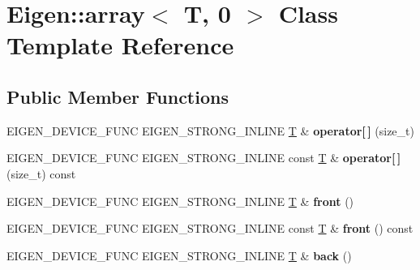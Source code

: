 \hypertarget{class_eigen_1_1array_3_01_t_00_010_01_4}{}\section{Eigen\+:\+:array$<$ T, 0 $>$ Class Template Reference}
\label{class_eigen_1_1array_3_01_t_00_010_01_4}
\subsection*{Public Member Functions}
\begin{DoxyCompactItemize}
\item 
\mbox{\label{class_eigen_1_1array_3_01_t_00_010_01_4_a37c62e5ec4b7ea518711ef63c3381d47}} 
E\+I\+G\+E\+N\+\_\+\+D\+E\+V\+I\+C\+E\+\_\+\+F\+U\+NC E\+I\+G\+E\+N\+\_\+\+S\+T\+R\+O\+N\+G\+\_\+\+I\+N\+L\+I\+NE \hyperlink{group___sparse_core___module}{T} \& {\bfseries operator\mbox{[}$\,$\mbox{]}} (size\+\_\+t)
\item 
\mbox{\label{class_eigen_1_1array_3_01_t_00_010_01_4_a276c1f31385f03d9c03df6a859bcb6c2}} 
E\+I\+G\+E\+N\+\_\+\+D\+E\+V\+I\+C\+E\+\_\+\+F\+U\+NC E\+I\+G\+E\+N\+\_\+\+S\+T\+R\+O\+N\+G\+\_\+\+I\+N\+L\+I\+NE const \hyperlink{group___sparse_core___module}{T} \& {\bfseries operator\mbox{[}$\,$\mbox{]}} (size\+\_\+t) const
\item 
\mbox{\label{class_eigen_1_1array_3_01_t_00_010_01_4_a665ea311f514508fcba9084b39d38f21}} 
E\+I\+G\+E\+N\+\_\+\+D\+E\+V\+I\+C\+E\+\_\+\+F\+U\+NC E\+I\+G\+E\+N\+\_\+\+S\+T\+R\+O\+N\+G\+\_\+\+I\+N\+L\+I\+NE \hyperlink{group___sparse_core___module}{T} \& {\bfseries front} ()
\item 
\mbox{\label{class_eigen_1_1array_3_01_t_00_010_01_4_a75685c5ac8ff4d88eb037da85b27531a}} 
E\+I\+G\+E\+N\+\_\+\+D\+E\+V\+I\+C\+E\+\_\+\+F\+U\+NC E\+I\+G\+E\+N\+\_\+\+S\+T\+R\+O\+N\+G\+\_\+\+I\+N\+L\+I\+NE const \hyperlink{group___sparse_core___module}{T} \& {\bfseries front} () const
\item 
\mbox{\label{class_eigen_1_1array_3_01_t_00_010_01_4_ae60d3aaa550a38bc33216b68d9e20f78}} 
E\+I\+G\+E\+N\+\_\+\+D\+E\+V\+I\+C\+E\+\_\+\+F\+U\+NC E\+I\+G\+E\+N\+\_\+\+S\+T\+R\+O\+N\+G\+\_\+\+I\+N\+L\+I\+NE \hyperlink{group___sparse_core___module}{T} \& {\bfseries back} ()

\end{DoxyCompactItemize}
